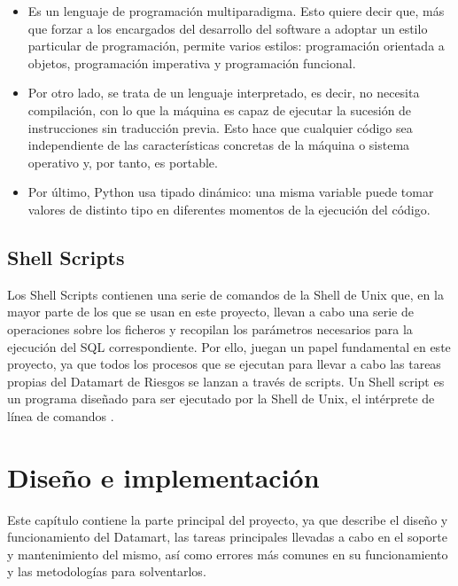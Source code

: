 \documentclass[a4paper, 12pt]{book}
\begin{document}
\begin{itemize}
	\item Es un lenguaje de programación multiparadigma. Esto quiere decir que, más que forzar a los encargados del desarrollo del software a adoptar un estilo particular de programación, permite varios estilos: programación orientada a objetos, programación imperativa y programación funcional.

	\item Por otro lado, se trata de un lenguaje interpretado, es decir, no necesita compilación, con lo que la máquina es capaz de ejecutar la sucesión de instrucciones sin traducción previa. Esto hace que cualquier código sea independiente de las características concretas de la máquina o sistema operativo y, por tanto, es portable.

	\item Por último, Python usa tipado dinámico: una misma variable puede tomar valores de distinto tipo en diferentes momentos de la ejecución del código.
\end{itemize}

\section{Shell Scripts}
\label{sec:Shell_Scripts}
Los Shell Scripts contienen una serie de comandos de la Shell de Unix que, en la mayor parte de los que se usan en este proyecto, llevan a cabo una serie de operaciones sobre los ficheros y recopilan los parámetros necesarios para la ejecución del SQL correspondiente. Por ello, juegan un papel fundamental en este proyecto, ya que todos los procesos que se ejecutan para llevar a cabo las tareas propias del Datamart de Riesgos se lanzan a través de scripts. Un Shell script es un programa diseñado para ser ejecutado por la Shell de Unix, el intérprete de línea de comandos \cite{kernighan1984unix}.


\cleardoublepage
\chapter{Diseño e implementación}

Este capítulo contiene la parte principal del proyecto, ya que describe el diseño y funcionamiento del Datamart, las tareas principales llevadas a cabo en el soporte y mantenimiento del mismo, así como errores más comunes en su funcionamiento y las metodologías para solventarlos.
\end{document}
